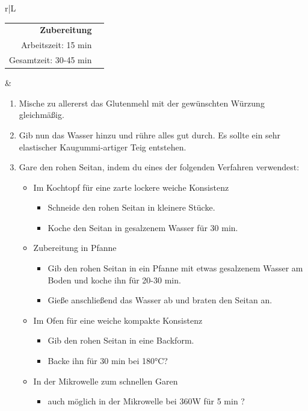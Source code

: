 \documentclass[a4paper, 12pt]{scrbook} 								%
\numberwithin{equation}{section} 									%
\begin{document}
	\newpage
	\begin{tabularx}{\textwidth}{r|L}
		\begin{tabular}[t]{rr}
			\textbf{Zubereitung}	\\
			Arbeitszeit: 15 min	\\
			Gesamtzeit:	30-45 min \\
		\end{tabular}			&	\begin{enumerate}[]
											\item Mische zu allererst das Glutenmehl mit der gewünschten Würzung gleichmäßig.
											\item Gib nun das Wasser hinzu und rühre alles gut durch. Es sollte ein sehr elastischer Kaugummi-artiger Teig entstehen.
											\item Gare den rohen Seitan, indem du eines der folgenden Verfahren verwendest:
											\begin{itemize}
												\item Im Kochtopf für eine zarte lockere weiche Konsistenz
												\begin{itemize}
													\item Schneide den rohen Seitan in kleinere Stücke.
													\item Koche den Seitan in gesalzenem Wasser für 30 min.
												\end{itemize}
												\item Zubereitung in Pfanne
												\begin{itemize}
													\item Gib den rohen Seitan in ein Pfanne mit etwas gesalzenem Wasser am Boden und koche ihn für 20-30 min.
													\item Gieße anschließend das Wasser ab und braten den Seitan an.
												\end{itemize}
												\item Im Ofen für eine weiche kompakte Konsistenz
												\begin{itemize}
													\item Gib den rohen Seitan in eine Backform.
													\item Backe ihn für 30 min bei 180°C?
												\end{itemize}
												\item In der Mikrowelle zum schnellen Garen
												\begin{itemize}
													\item auch möglich in der Mikrowelle bei 360W für 5 min ?
												\end{itemize}
											\end{itemize}
													
									\end{enumerate}	\\
	\end{tabularx}
	\newpage
\end{document}
